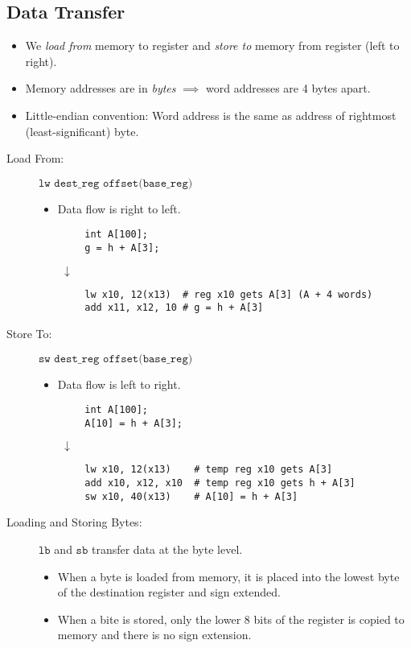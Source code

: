 \subsection{Data Transfer}
\begin{itemize}
    \item We \emph{load from} memory to register and \emph{store to} memory from register (left to right).
    \item Memory addresses are in \emph{bytes} $\implies$ word addresses are 4 bytes apart.
    \item Little-endian convention: Word address is the same as address of rightmost (least-significant) byte.
\end{itemize}

\begin{description}
    \item[Load From:] $\texttt{lw dest\_reg offset(base\_reg)}$
    \begin{itemize}
        \item Data flow is right to left.
    \end{itemize}
    \begin{verbatim}
		int A[100];
		g = h + A[3];
	\end{verbatim}
		$\qquad \downarrow$
	\begin{verbatim}
		lw x10, 12(x13)  # reg x10 gets A[3] (A + 4 words)
		add x11, x12, 10 # g = h + A[3]
	\end{verbatim}
	
	\item[Store To:] $\texttt{sw dest\_reg offset(base\_reg)}$
	\begin{itemize}
        \item Data flow is left to right.
    \end{itemize}
    \begin{verbatim}
		int A[100];
		A[10] = h + A[3];
	\end{verbatim}
		$\qquad \downarrow$
	\begin{verbatim}
		lw x10, 12(x13)    # temp reg x10 gets A[3]
		add x10, x12, x10  # temp reg x10 gets h + A[3]
		sw x10, 40(x13)    # A[10] = h + A[3]
	\end{verbatim}
	
	\item[Loading and Storing Bytes:] $\texttt{lb}$ and $\texttt{sb}$ transfer data at the byte level.
	\begin{itemize}
	    \item When a byte is loaded from memory, it is placed into the lowest byte of the destination register and sign extended.
	    \item When a bite is stored, only the lower 8 bits of the register is copied to memory and there is no sign extension.
	\end{itemize}
\end{description}

